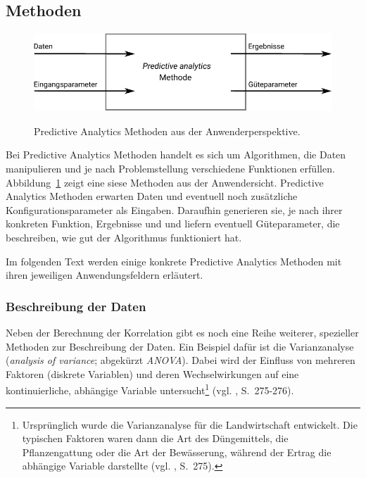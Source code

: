 \subsection{Methoden}

\begin{figure}%
\centering
\caption{Predictive Analytics Methoden aus der Anwenderperspektive.}
\includegraphics[scale=1.0]{Grafiken/PA_Methoden_Ink.pdf} 
\label{pic:PA_Methoden}
\end{figure}

Bei Predictive Analytics Methoden handelt es sich um Algorithmen, die Daten manipulieren und
je nach Problemstellung verschiedene Funktionen erfüllen. Abbildung~\ref{pic:PA_Methoden} zeigt eine
siese Methoden aus der Anwendersicht. Predictive Analytics Methoden erwarten Daten und eventuell noch zusätzliche
Konfigurationsparameter als Eingaben. Daraufhin generieren sie, je nach ihrer konkreten Funktion, Ergebnisse und
und liefern eventuell Güteparameter, die beschreiben, wie gut der Algorithmus funktioniert hat.

Im folgenden Text werden einige konkrete Predictive Analytics Methoden mit ihren jeweiligen Anwendungsfeldern
erläutert. 

\subsubsection{Beschreibung der Daten}

Neben der Berechnung der Korrelation gibt es noch eine Reihe weiterer, spezieller
Methoden zur Beschreibung der Daten. Ein Beispiel dafür ist die Varianzanalyse
(\emph{analysis of variance}; abgekürzt \emph{ANOVA}). Dabei wird der Einfluss
von mehreren Faktoren (diskrete Variablen) und deren Wechselwirkungen auf eine
kontinuierliche, abhängige Variable untersucht\footnote{
Ursprünglich wurde die Varianzanalyse für die Landwirtschaft entwickelt. Die
typischen Faktoren waren dann die Art des Düngemittels, die Pflanzengattung oder
die Art der Bewässerung, während der Ertrag die abhängige Variable darstellte
(vgl. \cite{Bijma}, S.~275).
} (vgl. \cite{Bijma}, S.~275-276).


